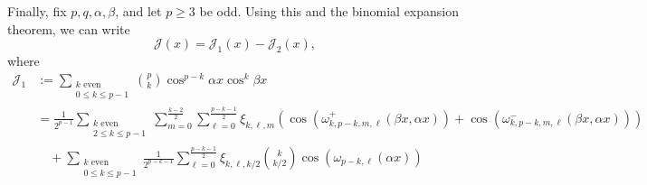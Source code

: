 \documentclass[12pt, reqno]{amsart}
\theoremstyle{plain}
\theoremstyle{definition}
\begin{document}
Finally, fix $p, q, \alpha, \beta$, and let $p\geq3$ be odd. Using this and the binomial expansion theorem, we can write 
\begin{equation}\label{decomJ}
    \mathcal{J}(x)=\mathcal{J}_1(x)-\mathcal{J}_2(x),
\end{equation} where
\begin{align*}
    \mathcal{J}_1 &:=\sum_{\substack{k \text{ even}\\ 0\le k\le p-1}}\binom{p}{k}\cos^{p-k}\alpha x\cos^k \beta x\\
    &=\frac{1}{2^{p-1}}\sum_{\substack{k\text{ even}\\2\leq k\leq p-1}}\sum_{m=0}^{\frac{k-2}{2}}\sum_{\ell=0}^{\frac{p-k-1}{2}}\xi_{k, \ell,m}(\cos(\omega^+_{k,p-k,m,\ell}( \beta x,\alpha x))+\cos(\omega^-_{k,p-k,m,\ell}(\beta x,\alpha x)))\\
    &\quad+\sum_{\substack{k\text{ even}\\0\leq k\leq p-1}}\frac{1}{2^{p-k-1}}\sum_{\ell=0}^{\frac{p-k-1}{2}}\xi_{k, \ell,k/2}{k\choose k/2}\cos(\omega_{p-k,\ell}(\alpha x))
\end{align*}
\end{document}
